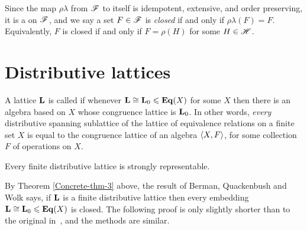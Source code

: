 Since the map $\rho \lambda$ from $\mathscr{F}$ to itself is idempotent, extensive, %
and order preserving, it is a 
on $\mathscr{F}$, and we say a set $F\in \mathscr{F}$ is
\emph{closed} if and only if $\rho\lambda(F) = F$. Equivalently,
$F$ is closed if and only if $F = \rho(H)$ for some $H\in \mathscr{H}$.



\section{Distributive lattices}
\label{sec:distr-latt}


A lattice $\mathbf{L}$ is called 
if whenever $\mathbf{L} \cong \mathbf{L}_0 \leqslant \mathbf{Eq}(X)$ for some $X$ then there is an algebra based on $X$
whose congruence lattice is $\mathbf{L}_0$.  In other words, \emph{every} 
distributive spanning sublattice of the lattice of equivalence relations on a finite set
$X$ is equal to the congruence lattice of an algebra $\langle X, F\rangle$, for some
collection $F$ of operations on $X$.

  
\begin{theorem}
  Every finite distributive lattice is strongly representable.
\end{theorem}

\begin{remarks}
  By Theorem \ref{Concrete-thm-3} above, the result of Berman, Quackenbush and
  Wolk says, if $\mathbf{L}$ is a finite distributive lattice then every embedding
  $\mathbf{L}\cong \mathbf{L}_0\leqslant \mathbf{Eq}(X)$ is closed. The following proof is only slightly
  shorter than to the original in~\cite{Quack:1971}, and the methods are similar. 
\end{remarks}

